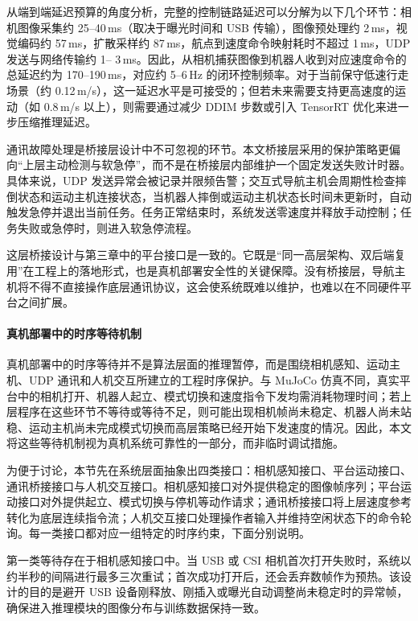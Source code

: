 从端到端延迟预算的角度分析，完整的控制链路延迟可以分解为以下几个环节：相机图像采集约 25--40\,ms（取决于曝光时间和 USB 传输），图像预处理约
2\,ms，视觉编码约 57\,ms，扩散采样约 87\,ms，航点到速度命令映射耗时不超过 1\,ms，UDP 发送与网络传输约 1--
3\,ms。因此，从相机捕获图像到机器人收到对应速度命令的总延迟约为 170--190\,ms，对应约 5--6\,Hz 的闭环控制频率。对于当前保守低速行走场景（约 0.12\,m/s），这一延迟水平是可接受的；但若未来需要支持更高速度的运动（如 0.8\,m/s 以上），则需要通过减少 DDIM 步数或引入 TensorRT
优化来进一步压缩推理延迟。

通讯故障处理是桥接层设计中不可忽视的环节。本文桥接层采用的保护策略更偏向``上层主动检测与软急停''，而不是在桥接层内部维护一个固定发送失败计时器。具体来说，UDP 发送异常会被记录并限频告警；交互式导航主机会周期性检查摔倒状态和运动主机连接状态，当机器人摔倒或运动主机状态长时间未更新时，自动触发急停并退出当前任务。任务正常结束时，系统发送零速度并释放手动控制；任务失败或急停时，则进入软急停流程。

这层桥接设计与第三章中的平台接口是一致的。它既是``同一高层架构、双后端复用''在工程上的落地形式，也是真机部署安全性的关键保障。没有桥接层，导航主机将不得不直接操作底层通讯协议，这会使系统既难以维护，也难以在不同硬件平台之间扩展。

\paragraph*{真机部署中的时序等待机制}

真机部署中的时序等待并不是算法层面的推理暂停，而是围绕相机感知、运动主机、UDP 通讯和人机交互所建立的工程时序保护。与 MuJoCo 仿真不同，真实平台中的相机打开、机器人起立、模式切换和速度指令下发均需消耗物理时间；若上层程序在这些环节不等待或等待不足，则可能出现相机帧尚未稳定、机器人尚未站稳、运动主机尚未完成模式切换而高层策略已经开始下发速度的情况。因此，本文将这些等待机制视为真机系统可靠性的一部分，而非临时调试措施。

为便于讨论，本节先在系统层面抽象出四类接口：相机感知接口、平台运动接口、通讯桥接接口与人机交互接口。相机感知接口对外提供稳定的图像帧序列；平台运动接口对外提供起立、模式切换与停机等动作请求；通讯桥接接口将上层速度参考转化为底层连续指令流；人机交互接口处理操作者输入并维持空闲状态下的命令轮询。每一类接口都对应一组特定的时序约束，下面分别说明。

第一类等待存在于相机感知接口中。当 USB 或 CSI 相机首次打开失败时，系统以约半秒的间隔进行最多三次重试；首次成功打开后，还会丢弃数帧作为预热。该设计的目的是避开 USB 设备刚释放、刚插入或曝光自动调整尚未稳定时的异常帧，确保进入推理模块的图像分布与训练数据保持一致。

